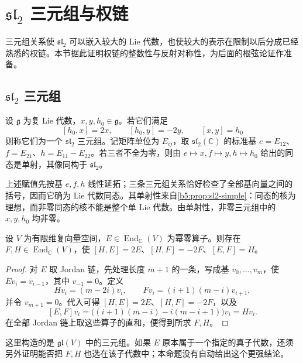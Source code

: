 
\section{\texorpdfstring{\(\mathfrak{sl}_2\)}{sl₂} 三元组与权链}
\label{b5:sec:1404}


%
%
%

三元组关系使 \(\mathfrak{sl}_2\) 可以嵌入较大的 Lie 代数，也使较大的表示在限制以后分成已经熟悉的权链。本节据此证明权链的整数性与反射对称性，为后面的根弦论证作准备。

\subsection{\texorpdfstring{\(\mathfrak{sl}_2\) 三元组}{sl2 三元组}}
\label{b5:subsec:1404:01}

\begin{definition}\label{b5:def:sl2-triple}
	设 \(\mathfrak g\) 为复 Lie 代数，\(x,y,h_0\in\mathfrak g\)。若它们满足
	\[
		[h_0,x]=2x,\qquad [h_0,y]=-2y,\qquad[x,y]=h_0
	\]
	则称它们为一个 \(\mathfrak{sl}_2\) 三元组。记矩阵单位为 \(E_{ij}\)，取 \(\mathfrak{sl}_2(\mathbb C)\) 的标准基 \(e=E_{12}\)、\(f=E_{21}\)、\(h=E_{11}-E_{22}\)。若三者不全为零，则由 \(e\mapsto x,f\mapsto y,h\mapsto h_0\) 给出的同态是单射，其像同构于 \(\mathfrak{sl}_2\)。
\end{definition}
上述赋值先按基 \(e,f,h\) 线性延拓；三条三元组关系恰好检查了全部基向量之间的括号，因而它确为 Lie 代数同态。其单射性来自\cref{b5:prop:sl2-simple}：同态的核为理想，而非零同态的核不能是整个单 Lie 代数。由单射性，非零三元组中的 \(x,y,h_0\) 均非零。
\begin{proposition}\label{b5:prop:nilpotent-matrix-sl2-triple}
	设 \(V\) 为有限维复向量空间，\(E\in\operatorname{End}_{\mathbb C}(V)\) 为幂零算子。则存在 \(F,H\in\operatorname{End}_{\mathbb C}(V)\)，使 \([H,E]=2E\)、\([H,F]=-2F\)、\([E,F]=H\)。
\end{proposition}
\begin{proof}
	对 \(E\) 取 Jordan 链，先处理长度 \(m+1\) 的一条，写成基 \(v_0,\ldots,v_m\)，使 \(Ev_i=v_{i-1}\)，其中 \(v_{-1}=0\)。定义
	\[
		Hv_i=(m-2i)v_i,\qquad Fv_i=(i+1)(m-i)v_{i+1},
	\]
	并令 \(v_{m+1}=0\)。代入可得 \([H,E]=2E\)、\([H,F]=-2F\)，以及
	\[
		[E,F]v_i=\bigl((i+1)(m-i)-i(m-i+1)\bigr)v_i=Hv_i.
	\]
	在全部 Jordan 链上取这些算子的直和，便得到所求 \(F,H\)。
\end{proof}
这里构造的是 \(\mathfrak{gl}(V)\) 中的三元组。如果 \(E\) 原本属于一个指定的真子代数，还须另外证明能否把 \(F,H\) 也选在该子代数中；本命题没有自动给出这个更强结论。

